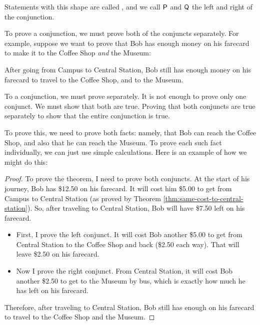 \documentclass[../../../main.tex]{subfiles}
\begin{document}
\noindent
Statements with this shape are called , and we call $\P/$ and $\Q/$ the left and right  of the conjunction.

To prove a conjunction, we must prove both of the conjuncts separately. For example, suppose we want to prove that Bob has enough money on his farecard to make it to the Coffee Shop \emph{and} the Museum: 

\begin{framed}
  \begin{theorem}
    After going from Campus to Central Station, Bob still has enough money on his farecard to travel to the Coffee Shop, and to the Museum.
  \end{theorem}
\end{framed}

\begin{aside}
  \begin{remark}
    To  a conjunction, we must prove  separately. It is not enough to prove only one conjunct. We must show that both are true. Proving that both conjuncts are true separately  to show that the entire conjunction is true.
  \end{remark}
\end{aside}

To prove this, we need to prove both facts: namely, that Bob can reach the Coffee Shop, and also that he can reach the Museum. To prove each such fact individually, we can just use simple calculations. Here is an example of how we might do this:

\begin{framed}
  \begin{proof}
    To prove the theorem, I need to prove both conjuncts. At the start of his journey, Bob has \$12.50 on his farecard. It will cost him \$5.00 to get from Campus to Central Station (as proved by Theorem \ref{thm:same-cost-to-central-station}). So, after traveling to Central Station, Bob will have \$7.50 left on his farecard.
    \begin{itemize}
      \item First, I prove the left conjunct. It will cost Bob another \$5.00 to get from Central Station to the Coffee Shop and back (\$2.50 each way). That will leave \$2.50 on his farecard.
      \item Now I prove the right conjunct. From Central Station, it will cost Bob another \$2.50 to get to the Museum by bus, which is exactly how much he has  left on his farecard.
    \end{itemize}

    \noindent
    Therefore, after traveling to Central Station, Bob still has enough on his farecard to travel to the Coffee Shop and the Museum.
  \end{proof}
\end{framed}
\end{document}
